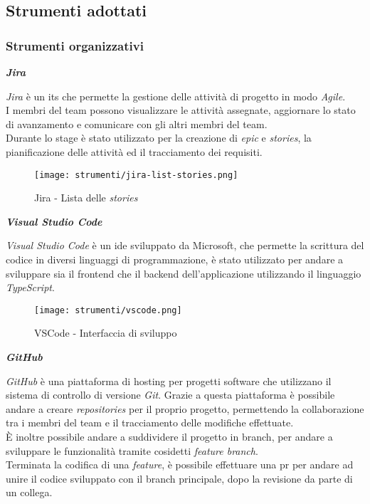 \pagebreak
\subsection{Strumenti adottati}
\label{sez:strumenti-adottati}

\subsubsection{Strumenti organizzativi}
\label{sez:strumenti-organizzativi}

\noindent \textbf{\textit{Jira\\}} 

\noindent \textit{Jira} è un \gls{its} che permette la gestione delle attività di progetto in modo \textit{Agile}.\\
I membri del team possono visualizzare le attività assegnate, aggiornare lo stato di avanzamento e comunicare con gli altri membri del team. \\
Durante lo stage è stato utilizzato per la creazione di \textit{epic} e \textit{stories}, la pianificazione delle attività ed il tracciamento dei requisiti.

\begin{figure}[H]
    \label{fig:jira-list-stories}
    \centering
    \texttt{[image: strumenti/jira-list-stories.png]}
    \caption{Jira - Lista delle \textit{stories}}
\end{figure}



\noindent \textbf{\textit{Visual Studio Code\\}}

\noindent \textit{Visual Studio Code} è un \gls{ide} sviluppato da Microsoft, che permette la scrittura del codice in diversi linguaggi di programmazione, è stato utilizzato per andare
a sviluppare sia il \gls{frontend} che il \gls{backend} dell'applicazione utilizzando il linguaggio \textit{TypeScript}.\\

\begin{figure}[H]
    \label{fig:vscode}
    \centering
    \texttt{[image: strumenti/vscode.png]}
    \caption{VSCode - Interfaccia di sviluppo}
\end{figure}

\pagebreak  
\noindent \textbf{\textit{GitHub\\}}

\noindent \textit{GitHub} è una piattaforma di hosting per progetti software che utilizzano il sistema di controllo di versione \textit{Git}.
Grazie a questa piattaforma è possibile andare a creare \textit{repositories} per il proprio progetto, permettendo la collaborazione tra i membri del team e il tracciamento delle modifiche effettuate. \\
È inoltre possibile andare a suddividere il progetto in \gls{branch}, per andare a sviluppare le funzionalità tramite cosidetti \textit{feature branch}.\\
Terminata la codifica di una \textit{feature}, è possibile effettuare una \gls{pr} per andare ad unire il codice sviluppato con il \gls{branch} principale, dopo la revisione da parte di un collega.


